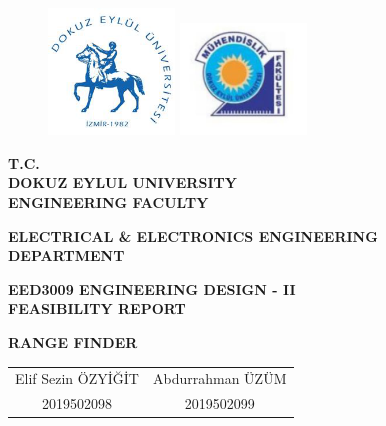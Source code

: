 \documentclass[12pt, a4paper]{article}
\begin{document}
    \begin{titlepage}
        \begin{center}

            \begin{figure}

                \subfloat
                {%
                    \includegraphics[width=0.3\textwidth]{deulogo.png}
                }
                \hfill
                \subfloat
                {%
                    \includegraphics[width=0.3\textwidth]{facultylogo.png}
                }

            \end{figure}

            \textbf{T.C.\\}
            \textbf{DOKUZ EYLUL UNIVERSITY\\}
            \textbf{ENGINEERING FACULTY\\}

            \vspace*{1 cm}
            \textbf{ELECTRICAL \& ELECTRONICS ENGINEERING\\}
            \textbf{DEPARTMENT\\}

            \vspace*{1 cm}
            \textbf{EED3009 ENGINEERING DESIGN - II\\}
            \textbf{FEASIBILITY REPORT\\}

            \textbf{RANGE FINDER}

            \vspace*{1 cm}

        
            \begin{table}[H]\centering
                \begin{tabular}{cc}
                    Elif Sezin ÖZYİĞİT \hspace{1cm}  & \hspace{1cm} Abdurrahman ÜZÜM \\
                    2019502098         \hspace{1cm}  & \hspace{1cm} 2019502099       \\             
                \end{tabular}
            \end{table}


\end{center}
\end{titlepage}
\end{document}
